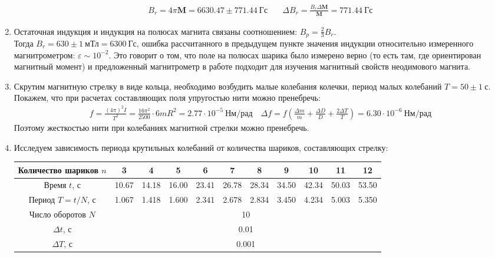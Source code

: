 \documentclass[a4paper, 10pt]{article}
\begin{document}
\begin{enumerate}
\begin{align*}
        {B_{r}} = 4\pi\mathbf{M} = 6630.47\pm 771.44\ \text{Гс} & \quad \Delta {B_{r}} = \frac{{B_{r}}\Delta \mathbf{M}}{\mathbf{M}} = 771.44\ \text{Гс}
    \end{align*}
    \item Остаточная индукция и индукция на полюсах магнита связаны соотношением: ${B_{p}} = \frac{2}{3}{B_{r}}$.\\ 
    Тогда ${B_{r}} = 630\pm 1\ \text{мТл} = 6300\ \text{Гс}$, ошибка рассчитанного в предыдущем пункте значения индукции относительно измеренного магнитрометром: $\varepsilon \sim 10^{-2}$. Это говорит о том, что
    поле на полюсах шарика было измерено верно (то есть там, где ориентирован магнитный момент) и предложенный магнитрометр в работе подходит для изучения магнитный свойств
    неодимового магнита.
    \item Скрутим магнитную стрелку в виде кольца, необходимо возбудить малые колебания колечки, период малых колебаний $T = 50\pm 1\ \text{с}$. Покажем, что при расчетах составляющих поля упругостью нити можно пренебречь:
    \begin{align*}
        f = \frac{(4\pi)^{2} I}{T^{2}} = \frac{16\pi^{2}}{2500}\cdot 6mR^{2} = 2.77\cdot 10^{-5}\ \text{Нм/рад} \quad \Delta f = f \left(\frac{\Delta m}{m} + \frac{\Delta D}{D} + \frac{2\Delta T}{T}\right) = 6.30\cdot 10^{-6}\ \text{Нм/рад}
    \end{align*}
    Поэтому жесткостью нити при колебаниях магнитной стрелки можно пренебречь.
    \item Исследуем зависимость периода крутильных колебаний от количества шариков, составляющих стрелку:
    \begin{center}
        \begin{tabular}{|c|c|c|c|c|c|c|c|c|c|c|}
            \hline
            Количество шариков $n$ & 3 & 4 & 5 & 6 & 7 & 8 & 9 & 10 & 11 & 12\\
            \hline
            Время $t$, с & 10.67 & 14.18 & 16.00 & 23.41 & 26.78 & 28.34 & 34.50 & 42.34 & 50.03 & 53.50\\
            Период $T = t/N$, с & 1.067 & 1.418 & 1.600 & 2.341 & 2.678 & 2.834 & 3.450 & 4.234 & 5.003 & 5.350\\
            \hline
            Число оборотов $N$ & \multicolumn{10}{|c|}{10}\\
            $\Delta t$, с & \multicolumn{10}{|c|}{0.01}\\
            $\Delta T$, с & \multicolumn{10}{|c|}{0.001}\\
            \hline

\end{tabular}
\end{center}
\end{enumerate}
\end{document}
